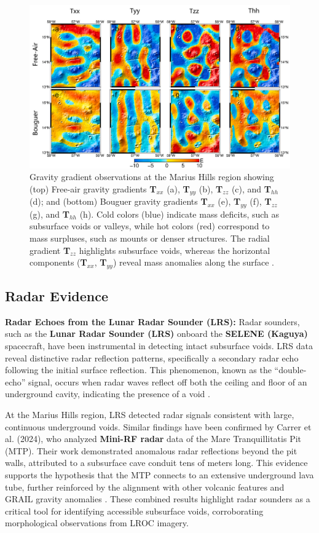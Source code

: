 \begin{figure}[H]
    \centering
    \includegraphics[width=0.85\linewidth]{grail-images-grabity.png}
    \caption{Gravity gradient observations at the Marius Hills region showing (top) Free-air gravity gradients \textbf{T$_{xx}$} (a), \textbf{T$_{yy}$} (b), \textbf{T$_{zz}$} (c), and \textbf{T$_{hh}$} (d); and (bottom) Bouguer gravity gradients \textbf{T$_{xx}$} (e), \textbf{T$_{yy}$} (f), \textbf{T$_{zz}$} (g), and \textbf{T$_{hh}$} (h). Cold colors (blue) indicate mass deficits, such as subsurface voids or valleys, while hot colors (red) correspond to mass surpluses, such as mounts or denser structures. The radial gradient \textbf{T$_{zz}$} highlights subsurface voids, whereas the horizontal components (\textbf{T$_{xx}$}, \textbf{T$_{yy}$}) reveal mass anomalies along the surface \cite{cavities-selene-lavatubes}.}
    \label{fig:marius-hills-gravity}
\end{figure}

\subsection{Radar Evidence}

\textbf{Radar Echoes from the Lunar Radar Sounder (LRS):} Radar sounders, such as the \textbf{Lunar Radar Sounder (LRS)} onboard the \textbf{SELENE (Kaguya)} spacecraft, have been instrumental in detecting intact subsurface voids. LRS data reveal distinctive radar reflection patterns, specifically a secondary radar echo following the initial surface reflection. This phenomenon, known as the “double-echo” signal, occurs when radar waves reflect off both the ceiling and floor of an underground cavity, indicating the presence of a void \citep{cavities-selene-lavatubes}.

At the Marius Hills region, LRS detected radar signals consistent with large, continuous underground voids. Similar findings have been confirmed by Carrer et al. (2024), who analyzed \textbf{Mini-RF radar} data of the Mare Tranquillitatis Pit (MTP). Their work demonstrated anomalous radar reflections beyond the pit walls, attributed to a subsurface cave conduit tens of meters long. This evidence supports the hypothesis that the MTP connects to an extensive underground lava tube, further reinforced by the alignment with other volcanic features and GRAIL gravity anomalies \citep{Carrer2024, cavities-selene-lavatubes}. These combined results highlight radar sounders as a critical tool for identifying accessible subsurface voids, corroborating morphological observations from LROC imagery.

